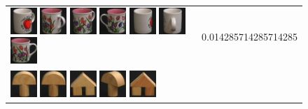 \begin{figure}[tbp]
\begin{center}
\begin{tabular}{m{11cm} | m{3cm} |}
\includegraphics[width=1cm]{coil/beeld-39.eps}
\includegraphics[width=1cm]{coil/beeld-10.eps}
\includegraphics[width=1cm]{coil/beeld-9.eps}
\includegraphics[width=1cm]{coil/beeld-7.eps}
\includegraphics[width=1cm]{coil/beeld-38.eps}
\includegraphics[width=1cm]{coil/beeld-41.eps}
\includegraphics[width=1cm]{coil/beeld-6.eps}
& {\scriptsize 0.014285714285714285}
\\
\includegraphics[width=1cm]{coil/beeld-0.eps}
\includegraphics[width=1cm]{coil/beeld-1.eps}
\includegraphics[width=1cm]{coil/beeld-42.eps}
\includegraphics[width=1cm]{coil/beeld-4.eps}
\includegraphics[width=1cm]{coil/beeld-43.eps}

\end{tabular}
\end{center}
\end{figure}
